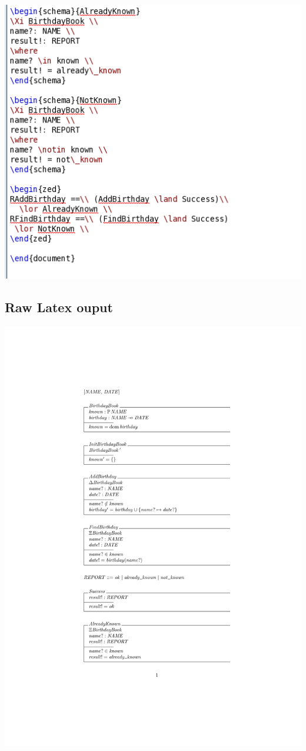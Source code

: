 \noindent \includegraphics[scale=0.5]{examples/bb/0imageb.png}
%
\subsection{Raw Latex ouput}
\label{app:bb0o}

\noindent \includegraphics[clip, trim=4cm 5.5cm 4cm 4.2cm]{examples/bb/0comp.pdf}

